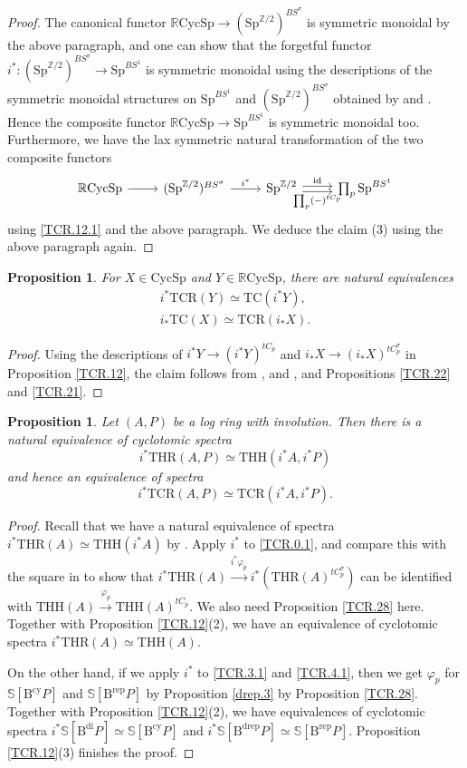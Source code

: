 \documentclass[10pt]{amsart}
\newtheorem{prop}[thm]{Proposition}
\theoremstyle{definition}
\theoremstyle{remark}
\numberwithin{equation}{section}
\newcommand{\Sphere}{\mathbb{S}}
\newcommand{\Z}{\mathbb{Z}}
\newcommand{\id}{\mathrm{id}}
\newcommand{\Sp}{\mathrm{Sp}}
\newcommand{\Bcy}{\mathrm{B}^\mathrm{cy}}
\newcommand{\Brep}{\mathrm{B}^\mathrm{rep}}
\newcommand{\Bdi}{\mathrm{B}^{\mathrm{di}}}
\newcommand{\Bdrep}{\mathrm{B}^\mathrm{drep}}
\newcommand{\CycSp}{\mathrm{CycSp}}
\newcommand{\RCycSp}{\mathbb{R}\mathrm{CycSp}}
\newcommand{\THH}{\mathrm{THH}}
\newcommand{\THR}{\mathrm{THR}}
\newcommand{\TC}{\mathrm{TC}}
\newcommand{\TCR}{\mathrm{TCR}}
\begin{document}
\begin{proof}
The canonical functor $\RCycSp\to (\Sp^{\Z/2})^{BS^\sigma}$ is symmetric monoidal by the above paragraph,
and one can show that the forgetful functor
$i^*\colon (\Sp^{\Z/2})^{BS^\sigma} \to \Sp^{BS^1}$ is symmetric monoidal using the descriptions of the symmetric monoidal structures on $\Sp^{BS^1}$ and $(\Sp^{\Z/2})^{BS^\sigma}$ obtained by \cite[Construction IV.2.1(1)]{NS} and \cite[Example 5.13]{QS1}.
Hence the composite functor $\RCycSp\to \Sp^{BS^1}$ is symmetric monoidal too.
Furthermore,
we have the lax symmetric natural transformation of the two composite functors
\[
\begin{tikzcd}
\RCycSp\ar[r]&
(\Sp^{\Z/2})^{BS^\sigma}\ar[r,"i^*"]&
\Sp^{\Z/2}\ar[r,shift left=0.5ex,"\id"]\ar[r,shift right=0.5ex,"\prod_p (-)^{tC_p}"']&
\prod_p\Sp^{BS^1}
\end{tikzcd}
\]
using \eqref{TCR.12.1} and the above paragraph.
We deduce the claim (3) using the above paragraph again.
\end{proof}

\begin{prop}
\label{TCR.23}
For $X\in \CycSp$ and $Y\in \RCycSp$,
there are natural equivalences
\begin{gather*}
i^*\TCR(Y)
\simeq
\TC(i^*Y),
\\
i_*\TC(X)
\simeq
\TCR(i_*X).
\end{gather*}
\end{prop}
\begin{proof}
Using the descriptions of $i^*Y\to (i^*Y)^{tC_p}$ and $i_*X\to (i_*X)^{tC_p^\sigma}$ in Proposition \ref{TCR.12},
the claim follows from \cite[Corollary 1.5]{NS}, and \cite[Theorem C(3)]{QS2},
and Propositions \ref{TCR.22} and \ref{TCR.21}.
\end{proof}


\begin{prop}
\label{TCR.27}
Let $(A,P)$ be a log ring with involution.
Then there is a natural equivalence of cyclotomic spectra
\[
i^*\THR(A,P)
\simeq
\THH(i^*A,i^*P)
\]
and hence an equivalence of spectra
\[
i^*\TCR(A,P)
\simeq
\TCR(i^*A,i^*P).
\]
\end{prop}
\begin{proof}
Recall that we have a natural equivalence of spectra $i^*\THR(A)\simeq \THH(i^*A)$ by \cite[Proposition 3.4.7]{THR}.
Apply $i^*$ to \eqref{TCR.0.1},
and compare this with the square in \cite[p.\ 342]{NS} to show that $i^*\THR(A)\xrightarrow{i^*\varphi_p} i^*(\THR(A)^{tC_p^\sigma})$ can be identified with $\THH(A)\xrightarrow{\varphi_p} \THH(A)^{tC_p}$.
We also need Proposition \ref{TCR.28} here.
Together with Proposition \ref{TCR.12}(2),
we have an equivalence of cyclotomic spectra $i^*\THR(A)\simeq \THH(A)$.

On the other hand, if we apply $i^*$ to \eqref{TCR.3.1} and \eqref{TCR.4.1},
then we get $\varphi_p$ for $\Sphere[\Bcy P]$ and $\Sphere[\Brep P]$ by Proposition \ref{drep.3} by Proposition \ref{TCR.28}.
Together with Proposition \ref{TCR.12}(2),
we have equivalences of cyclotomic spectra $i^*\Sphere[\Bdi P]\simeq \Sphere[\Bcy P]$ and $i^*\Sphere[\Bdrep P]\simeq \Sphere[\Brep P]$.
Proposition \ref{TCR.12}(3) finishes the proof.
\end{proof}
\end{document}
